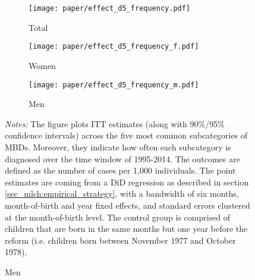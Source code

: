 \begin{landscape}
	\vspace*{\fill}
	\begin{figure}
		[H]\centering
		\caption{ITT effect for subcategories of mental and behavioral disorders}\label{fig_mlch: ITT_d5_subcategories}
		\begin{subfigure}[h]{0.31\linewidth}\centering\caption{Total}
			\texttt{[image: paper/effect\_d5\_frequency.pdf]}
		\end{subfigure}
		\begin{subfigure}[h]{0.31\linewidth}\centering\caption{Women}
			\texttt{[image: paper/effect\_d5\_frequency\_f.pdf]}
		\end{subfigure}
		\begin{subfigure}[h]{0.31\linewidth}\centering\caption{Men}
			\texttt{[image: paper/effect\_d5\_frequency\_m.pdf]}
		\end{subfigure}
		\scriptsize
		\begin{minipage}{0.95\linewidth}
			\emph{Notes:} The figure plots ITT estimates (along with 90\%/95\% confidence intervals) across the five most common subcategories of MBDs. Moreover, they indicate how often each subcategory is diagnosed over the time window of 1995-2014. The outcomes are defined as the number of cases per 1,000 individuals. The point estimates are coming from a DiD regression as described in section \ref{sec_mlch:empirical_strategy}, with a bandwidth of six months, month-of-birth and year fixed effects, and standard errors clustered at the month-of-birth level. The control group is comprised of children that are born in the same months but one year before the reform (i.e. children born between November 1977 and October 1978).\newline
		\end{minipage}
	\end{figure}
	\vspace*{\fill}\clearpage
\end{landscape}
\restoregeometry 
